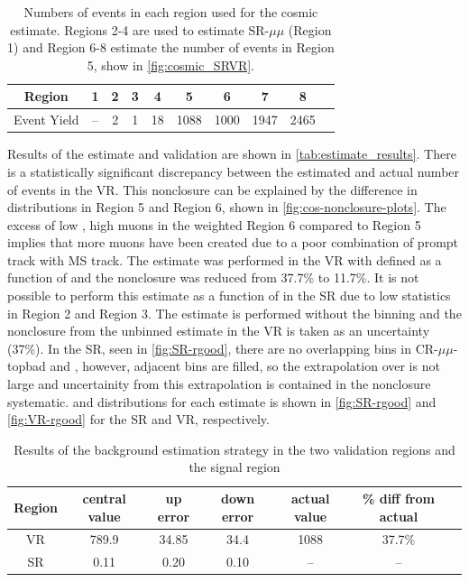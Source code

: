 \begin{table}
\centering
\begin{tabular}{cccccccccc}
Region & 1    & 2 & 3 & 4 & 5 & 6 & 7 & 8\\
\hline
Event Yield & --  & 2 & 1 & 18 & 1088 & 1000 & 1947 & 2465 \\
\hline
\end{tabular}
\caption{Numbers of events in each region used for the cosmic estimate. Regions 2-4 are used to estimate SR-$\mu\mu$ (Region 1) and Region 6-8 estimate the number of events in Region 5, show in \autoref{fig:cosmic_SRVR}.}
\label{tab:estimate_counts}
\end{table}

Results of the estimate and validation are shown in \autoref{tab:estimate_results}. There is a statistically significant discrepancy between the estimated and actual number of events in the VR. This nonclosure can be explained by the difference in \absdz distributions in Region 5 and Region 6, shown in \autoref{fig:cos-nonclosure-plots}. The excess of low \absdz, high \chiCB muons in the weighted Region 6 compared to Region 5 implies that more muons have been created due to a poor combination of prompt track with MS track. The estimate was performed in the VR with \rgood  defined as a function of \absdz and the nonclosure was reduced from 37.7\% to 11.7\%. It is not possible to perform this estimate as a function of \absdz in the SR due to low statistics in Region 2 and Region 3. The estimate is performed without the \absdz binning and the nonclosure from the unbinned estimate in the VR is taken as an uncertainty (37\%). In the SR, seen in \autoref{fig:SR-rgood}, there are no overlapping \absdz bins in CR-$\mu\mu$-topbad and \rgood, however, adjacent bins are filled, so the extrapolation over \absdz is not large and uncertainity from this extrapolation is contained in the nonclosure systematic. \rgood and \absdz distributions for each estimate is shown in \autoref{fig:SR-rgood} and \autoref{fig:VR-rgood} for the SR and VR, respectively.

\begin{table}
\centering{}
\begin{tabular}{ccccccc}
Region & central value & up error & down error & actual value & \% diff from actual \\
\hline
VR        & 789.9  & 34.85 & 34.4 & 1088 & 37.7\%  \\
SR        & 0.11 & 0.20  & 0.10  & --   & --   \\
\hline
\end{tabular}
\caption{Results of the background estimation strategy in the two validation regions and the signal region}
\label{tab:estimate_results}
\end{table}

